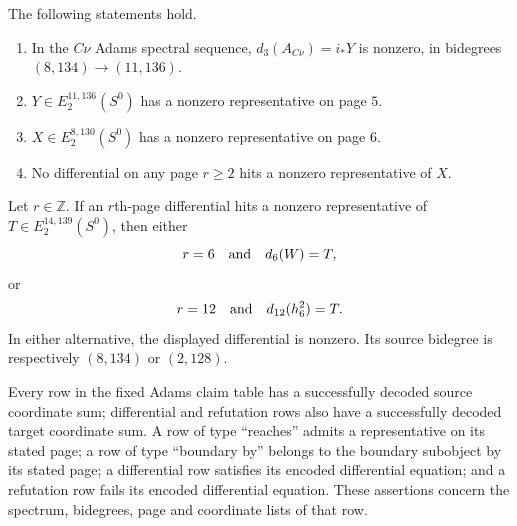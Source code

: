 \begin{theorem}
\label{frontier:AdamsCalculations:6428c2d83d1a}
The following statements hold.
\begin{enumerate}
\item In the $C\nu$ Adams spectral sequence, $d_3(A_{C\nu})=i_*Y$ is nonzero, in bidegrees $(8,134)\longrightarrow(11,136)$.
\item $Y\in E_2^{11,136}(S^0)$ has a nonzero representative on page $5$.
\item $X\in E_2^{8,130}(S^0)$ has a nonzero representative on page $6$.
\item No differential on any page $r\geq2$ hits a nonzero representative of $X$.
\end{enumerate}
\end{theorem}

\begin{theorem}
\label{frontier:AdamsCalculations:f6a9ba54d96c}
Let $r\in\mathbb Z$. If an $r$th-page differential hits a nonzero representative of $T\in E_2^{14,139}(S^0)$, then either
\[r=6\quad\hbox{and}\quad d_6(W)=T,\]
or
\[r=12\quad\hbox{and}\quad d_{12}(h_6^2)=T.\]
In either alternative, the displayed differential is nonzero. Its source bidegree is respectively $(8,134)$ or $(2,128)$.
\end{theorem}

\begin{theorem}
\label{frontier:AdamsCalculations:84a3eb0053cf}
Every row in the fixed Adams claim table has a successfully decoded source coordinate sum; differential and refutation rows also have a successfully decoded target coordinate sum. A row of type ``reaches'' admits a representative on its stated page; a row of type ``boundary by'' belongs to the boundary subobject by its stated page; a differential row satisfies its encoded differential equation; and a refutation row fails its encoded differential equation. These assertions concern the spectrum, bidegrees, page and coordinate lists of that row.
\end{theorem}

